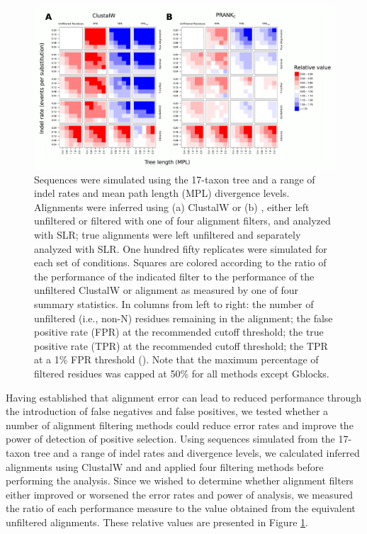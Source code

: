 \documentclass{mbe}
\begin{document}
\begin{figure}[t]
\begin{center}
\includegraphics[scale=0.65]{fig5.pdf}
\end{center}
\caption{Sequences were simulated using the 17-taxon tree and a range
  of indel rates and mean path length (MPL) divergence
  levels. Alignments were inferred using (a) ClustalW or (b) \prankc,
  either left unfiltered or filtered with one of four alignment
  filters, and analyzed with SLR; true alignments were left unfiltered
  and separately analyzed with SLR. One hundred fifty replicates were
  simulated for each set of conditions. Squares are colored according
  to the ratio of the performance of the indicated filter to the
  performance of the unfiltered ClustalW or \prankc alignment as
  measured by one of four summary statistics. In columns from left to
  right: the number of unfiltered (i.e., non-N) residues remaining
  in the alignment; the false positive rate (FPR) at the recommended
  cutoff threshold; the true positive rate (TPR) at the recommended
  cutoff threshold; the TPR at a 1\% FPR threshold (\tpr). Note that the
  maximum percentage of filtered residues was capped at 50\% for all
  methods except Gblocks.}
\label{fig_5}
\end{figure}

Having established that alignment error can lead to reduced \sw
performance through the introduction of false negatives and false
positives, we tested whether a number of alignment filtering methods
could reduce error rates and improve the power of \sw detection of
positive selection. Using sequences simulated from the 17-taxon tree
and a range of indel rates and divergence levels, we calculated
inferred alignments using ClustalW and \prankc and applied four
filtering methods before performing the \sw analysis. Since we wished
to determine whether alignment filters either improved or worsened the
error rates and power of \sw analysis, we measured the ratio of each
performance measure to the value obtained from the equivalent
unfiltered alignments. These relative values are presented in Figure
\ref{fig_5}.
\end{document}
